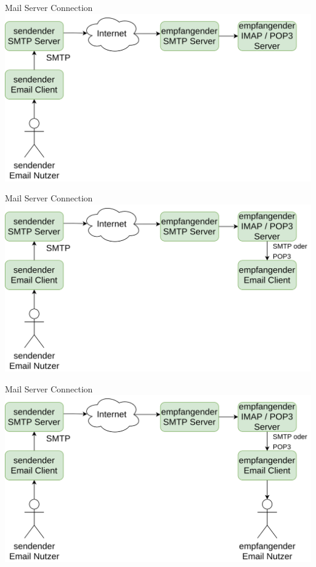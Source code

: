 \documentclass[aspectratio=169]{beamer}
\begin{document}
\begin{frame}[plain]{Mail Server Connection}
    \centering
    \includegraphics[height=.8\textheight]{media/mail-diagram-06.png}
\end{frame}

\begin{frame}[plain]{Mail Server Connection}
    \centering
    \includegraphics[height=.8\textheight]{media/mail-diagram-07.png}
\end{frame}

\begin{frame}[plain]{Mail Server Connection}
    \centering
    \includegraphics[height=.8\textheight]{media/mail-diagram-08.png}
\end{frame}
\end{document}

